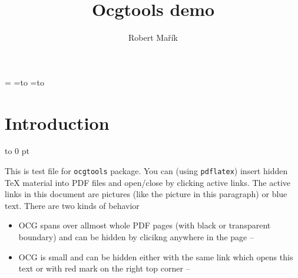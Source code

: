 \usepackage[metapost]{mfpic}
\usepackage{amsmath}
\usepackage{helvet}
\let\rmdefault\sfdefault

\usepackage{wrapfig}
\def\beamernewpage{\ifx \usetheme \undefined \relax \else \newpage\fi}

\ifx \ifweb@navibar \undefined \relax \else
{}
\newbox\backgroundbox
\newbox\backgroundboxa
\setbox\backgroundboxa=\hbox{}
\newbox\backgroundboxb
\setbox\backgroundboxb=\hbox to \paperwidth{\xleaders\copy\backgroundboxa\hfill}
\newbox\backgroundboxc
\setbox\backgroundboxc=\vbox to \paperheight{\xleaders\copy\backgroundboxb\vfill}
\makeatletter
 \def\ocgtools@shipoutstart@hook{\hbox to 0 pt{%
    \kern -1in \vbox to 0 pt{\vss\copy\backgroundboxc}
    \hss}}
\makeatother
\fi



\sloppy
\fboxsep=4pt

\title{Ocgtools demo}
\author{Robert Ma\v{r}\'{i}k}

\maketitle
\def\maxwell{
\nabla \cdot D&= \rho \\
\nabla \cdot B&=0 \\
\nabla \times E&=- \frac{\partial B}{\partial t}\\
\nabla \times H&=J+ \frac{\partial D}{\partial t}}

\tableofcontents
\beamernewpage
\makeatletter\ifx\PDFSCR@Info\undefined\relax\else\newpage\fi\makeatother

\section{Introduction}

\vbox to 0 pt{\noindent\hbox{}
  \vss}

\hangindent=3.5cm  \noindent This is test file for
\texttt{ocgtools} package. You can (using \texttt{pdflatex}) insert
hidden \TeX{} material into PDF files and open/close by clicking
active links. The active links in this document are pictures (like the
picture in this paragraph) or blue text. There are two kinds of
behavior
\begin{itemize}
\item OCG spans over allmost whole PDF pages (with black or
  transparent boundary) and can be hidden by clicikng anywhere in the
  page --  \makeatletter
     \makeatother
  
\item OCG is small and can be hidden either with the same link which
  opens this text or with red mark on the right top corner --
\end{itemize}

